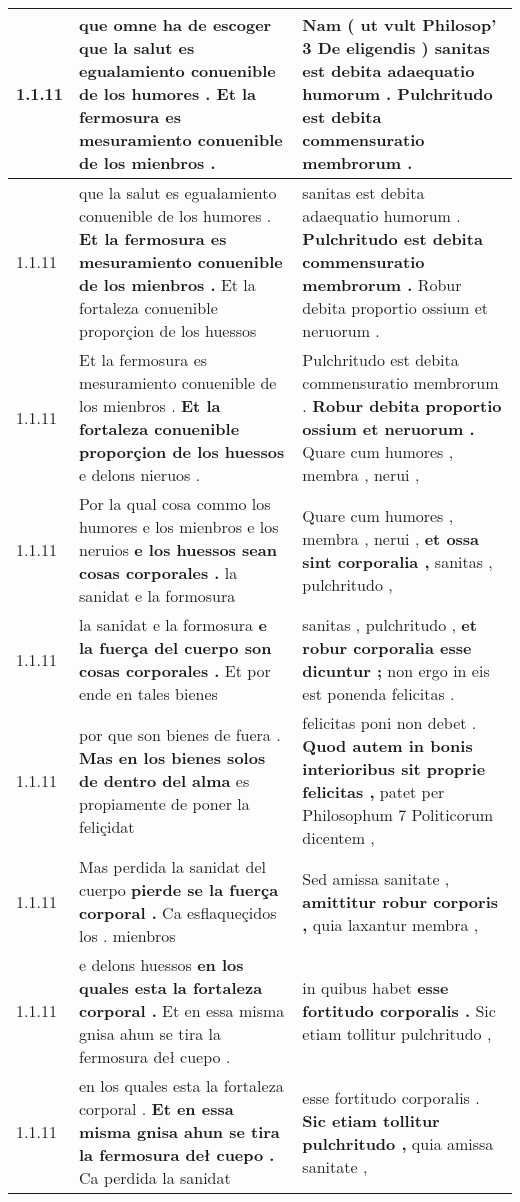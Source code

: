 \begin{tabular}{|p{1cm}|p{6.5cm}|p{6.5cm}|}
1.1.11 & que omne ha de escoger \textbf{ que la salut es egualamiento conuenible de los humores . } Et la fermosura es mesuramiento conuenible de los mienbros . & Nam ( ut vult Philosop’ 3 De eligendis ) \textbf{ sanitas est debita adaequatio humorum . } Pulchritudo est debita commensuratio membrorum . \\\hline
1.1.11 & que la salut es egualamiento conuenible de los humores . \textbf{ Et la fermosura es mesuramiento conuenible de los mienbros . } Et la fortaleza conuenible proporçion de los huessos & sanitas est debita adaequatio humorum . \textbf{ Pulchritudo est debita commensuratio membrorum . } Robur debita proportio ossium et neruorum . \\\hline
1.1.11 & Et la fermosura es mesuramiento conuenible de los mienbros . \textbf{ Et la fortaleza conuenible proporçion de los huessos } e delons nieruos . & Pulchritudo est debita commensuratio membrorum . \textbf{ Robur debita proportio ossium et neruorum . } Quare cum humores , membra , nerui , \\\hline
1.1.11 & Por la qual cosa commo los humores e los mienbros e los neruios \textbf{ e los huessos sean cosas corporales . } la sanidat e la formosura & Quare cum humores , membra , nerui , \textbf{ et ossa sint corporalia , } sanitas , pulchritudo , \\\hline
1.1.11 & la sanidat e la formosura \textbf{ e la fuerça del cuerpo son cosas corporales . } Et por ende en tales bienes & sanitas , pulchritudo , \textbf{ et robur corporalia esse dicuntur ; } non ergo in eis est ponenda felicitas . \\\hline
1.1.11 & por que son bienes de fuera . \textbf{ Mas en los bienes solos de dentro del alma } es propiamente de poner la feliçidat & felicitas poni non debet . \textbf{ Quod autem in bonis interioribus sit proprie felicitas , } patet per Philosophum 7 Politicorum dicentem , \\\hline
1.1.11 & Mas perdida la sanidat del cuerpo \textbf{ pierde se la fuerça corporal . } Ca esflaqueçidos los . mienbros & Sed amissa sanitate , \textbf{ amittitur robur corporis , } quia laxantur membra , \\\hline
1.1.11 & e delons huessos \textbf{ en los quales esta la fortaleza corporal . } Et en essa misma gnisa ahun se tira la fermosura deł cuepo . & in quibus habet \textbf{ esse fortitudo corporalis . } Sic etiam tollitur pulchritudo , \\\hline
1.1.11 & en los quales esta la fortaleza corporal . \textbf{ Et en essa misma gnisa ahun se tira la fermosura deł cuepo . } Ca perdida la sanidat & esse fortitudo corporalis . \textbf{ Sic etiam tollitur pulchritudo , } quia amissa sanitate , \\\hline

\end{tabular}
